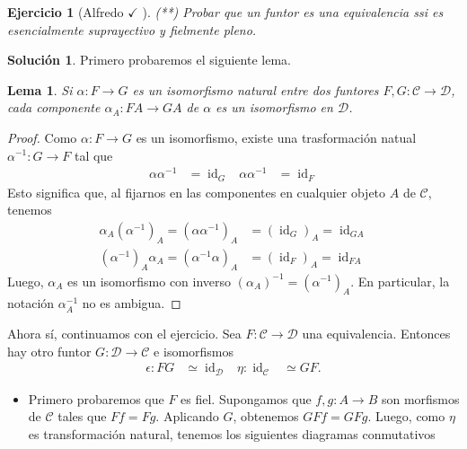 \documentclass[12pt,letterpaper,titlepage]{article}
\newtheorem{exe}{Ejercicio}
\newtheorem*{lemma}{Lema}
\theoremstyle{definition}
\newtheorem*{sol}{Solución}
\renewcommand\cal[1]{\mathcal{#1}}
\newcommand\<{\langle}
\renewcommand\>{\rangle}
\DeclareMathOperator{\id}{id}
\begin{document}
\begin{exe}[Alfredo $\checkmark$ ]
    (**) Probar que un funtor es una equivalencia ssi es
      esencialmente suprayectivo y fielmente pleno.
\end{exe}
\begin{sol}
    Primero probaremos el siguiente lema.
    \begin{lemma}
        Si $\alpha:F\to G$ es un isomorfismo natural entre dos funtores
        $F,G:\cal C\to\cal D$, cada componente $\alpha_A:FA\to GA$ de
        $\alpha$ es un isomorfismo en $\cal D$.
    \end{lemma}
    \begin{proof}
        Como $\alpha:F\to G$ es un isomorfismo, existe una trasformación
        natual $\alpha^{-1}:G\to F$ tal que
        \begin{align*}
            \alpha\alpha^{-1} &= \id_G
                & \alpha\alpha^{-1} &= \id_F
        \end{align*}
        Esto significa que, al fijarnos en
        las componentes en cualquier objeto $A$ de $\cal C$, tenemos
        \begin{align*}
                \alpha_A(\alpha^{-1})_A
                = (\alpha\alpha^{-1})_A
                &= (\id_G)_A
                = \id_{GA} \\
                (\alpha^{-1})_A\alpha_A
                =(\alpha^{-1}\alpha)_A
                &= (\id_{F})_A
                = \id_{FA}
        \end{align*}
        Luego, $\alpha_A$ es un isomorfismo con inverso
        $(\alpha_A)^{-1}=(\alpha^{-1})_A$.
        En particular, la notación $\alpha^{-1}_A$ no es ambigua.
    \end{proof}
    Ahora sí, continuamos con el ejercicio.
    Sea $F:\cal C \to \cal D$ una equivalencia.
    Entonces hay otro funtor $G:\cal D\to \cal C$ e isomorfismos
    \begin{align*}
        \epsilon : FG &\simeq \id_{\cal D} & \eta : \id_{\cal C} &\simeq GF.
    \end{align*}
    \begin{itemize}
        \item 
        Primero probaremos que $F$ es fiel.
        Supongamos que $f,g:A\to B$ son morfismos de $\cal C$ tales que
        $Ff = Fg$.
        Aplicando $G$, obtenemos $GFf=GFg$.
        Luego, como $\eta$ es transformación natural, tenemos los siguientes
        diagramas conmutativos
        \[
        \begin{tikzcd}

\end{tikzcd}\]
\end{itemize}
\end{sol}
\end{document}

